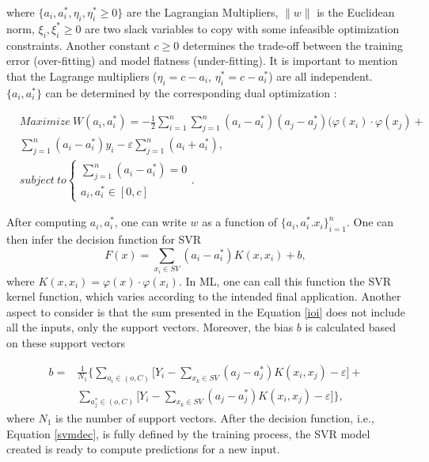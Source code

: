where $\{a_i, a_i^*, \eta_i, \eta_i^*\geq 0\}$ are the Lagrangian Multipliers, $\parallel w \parallel$ is the Euclidean norm, ${{\xi_i,\xi_i^*\geq 0}}$ are two slack variables to copy with some infeasible optimization constraints\cite{review2017}. Another constant $c \geq 0$ determines the trade-off between the training error (over-fitting) and model flatness (under-fitting)\cite{review2017}. 
It is important to mention that the Lagrange multipliers ($\eta_i = c - a_i$, $\eta_i^* = c-a_i^*$) are all independent. $\{a_i, a_i^*\}$ can be determined by the corresponding dual optimization \cite{ann1}:

\begin{equation}
\begin{split}
       & Maximize \  W(a_i, a_i^*) = -\frac{1}{2}\sum_{i=1}^{n}\sum_{j=1}^{n}(a_i-a_i^*)(a_j-a_j^*)(\varphi(x_i)\cdot \varphi(x_j) + \\
       & \sum_{j=1}^{n}(a_i-a_i^*)y_i - \varepsilon \sum_{j=1}^{n}(a_i+a_i^*),\\
       & subject \  to \begin{cases} \sum_{j=1}^{n}(a_i-a_i^*) = 0 \\ a_i, a_i^* \in [0,c] \end{cases} .
\end{split}
\end{equation}

After computing $a_i, a_i^*$, one can write $w$ as a function of $\{ a_i, a_i^*. x_i\}_{i=1}^n$. One can then infer the decision function for \ac{SVR}
\begin{equation}
      F(x) = \sum_{x_i \in SV} (a_i-a_i^*)K(x, x_i)+b , 
      \label{ioi}
\end{equation}
 where $K(x, x_i) = \varphi(x)\cdot\varphi(x_i)$. In \ac{ML}, one can call this function the \ac{SVR} kernel function, which varies according to the intended final application. Another aspect to consider is that the sum presented in the Equation \ref{ioi} does not include all the inputs, only the support vectors. Moreover, the bias $b$ is calculated based on these support vectors

\begin{equation}
\begin{split}
       b = & \frac{1}{N_1} \Bigg\{ \sum_{a_i \in (o,C)} \Bigg[ Y_i-\sum_{x_k\in SV}(a_j-a_j^*)K(x_i, x_j) - \varepsilon \Bigg] + \\
           & \sum_{a^*_j \in (o,C)}\Bigg[Y_i-\sum_{x_k\in SV}(a_j-a_j^*)K(x_i, x_j) - \varepsilon\Bigg] \Bigg\},
\end{split}
\end{equation}
 where $N_1$ is the number of support vectors. After the decision function, i.e., Equation \ref{svmdec}, is fully defined by the training process, the \ac{SVR} model created is ready to compute predictions for a new input\cite{review2017}.
 

